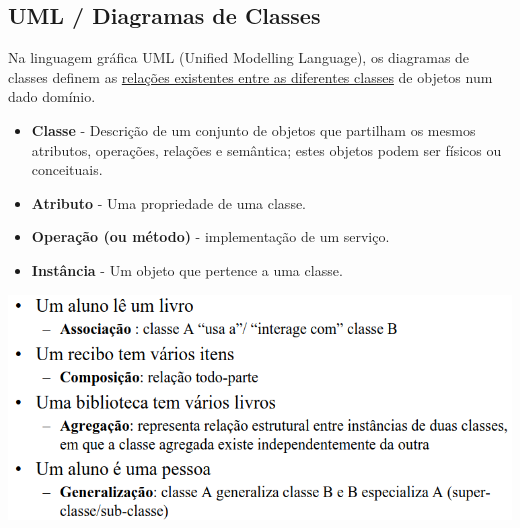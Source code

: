 \documentclass{article}
\begin{document}
\pagebreak

\subsection{UML / Diagramas de Classes}

Na linguagem gráfica UML (Unified Modelling Language), os
diagramas de classes definem as \uline{relações existentes entre as
diferentes classes} de objetos num dado domínio.
\begin{itemize}
  \item \textbf{Classe} - Descrição de um conjunto de objetos que partilham os mesmos
  atributos, operações, relações e semântica; estes objetos podem ser físicos
  ou conceituais.
  \item \textbf{Atributo} - Uma propriedade de uma classe.
  \item \textbf{Operação (ou método)} - implementação de um serviço.
  \item \textbf{Instância} - Um objeto que pertence a uma classe.
\end{itemize}

\begin{center}
  \includegraphics[scale=0.35]{22}
\end{center}
\end{document}
